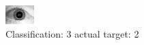 \begin{figure}[h!]
\begin{center}
\includegraphics[width=0.60\columnwidth]{figures/ID1677_class_3_target_2.png}
\end{center}
\caption{ Classification: 3 actual target: 2}
\label{fig:ID1677_class_3_target_2}
\end{figure}
